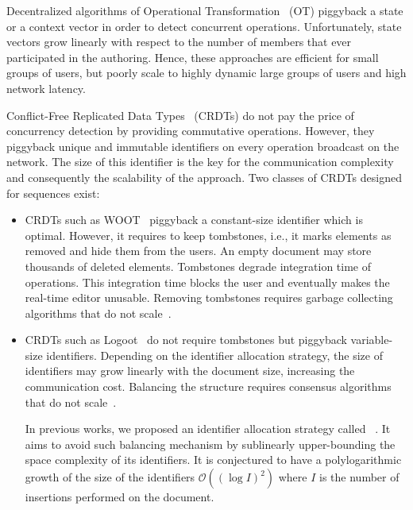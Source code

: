 Decentralized algorithms of Operational
Transformation~\cite{sun2009contextbased} (OT) piggyback a state or a context
vector in order to detect concurrent operations. Unfortunately, state vectors
grow linearly with respect to the number of members that ever participated in
the authoring. Hence, these approaches are efficient for small groups of users,
but poorly scale to highly dynamic large groups of users and high network
latency.

Conflict-Free Replicated Data Types~\cite{shapiro2011comprehensive} (CRDTs) do
not pay the price of concurrency detection by providing commutative
operations. However, they piggyback unique and immutable identifiers on every
operation broadcast on the network. The size of this identifier is the key for
the communication complexity and consequently the scalability of the
approach. Two classes of CRDTs designed for sequences exist:
\begin{itemize}[noitemsep, leftmargin=*]
\item  CRDTs such as WOOT~\cite{oster2006data} piggyback a constant-size
  identifier which is optimal. However, it requires to keep tombstones, i.e., it
  marks elements as removed and hide them from the users. An empty document may
  store thousands of deleted elements. Tombstones degrade integration time of
  operations. This integration time blocks the user and eventually makes the
  real-time editor unusable. Removing tombstones requires garbage collecting
  algorithms that do not scale~\cite{abdullahi1998garbage}.
\item CRDTs such as Logoot~\cite{weiss2010logootundo} do not require tombstones
  but piggyback variable-size identifiers. Depending on the identifier
  allocation strategy, the size of identifiers may grow linearly with the
  document size, increasing the communication cost. Balancing the structure
  requires consensus algorithms that do not
  scale~\cite{mostefaoui2015signature}.

  In previous works, we proposed an identifier allocation strategy called
  \LSEQ~\cite{nedelec2013concurrency, nedelec2013lseq}. It aims to avoid such
  balancing mechanism by sublinearly upper-bounding the space complexity of its
  identifiers. It is conjectured to have a polylogarithmic growth of the size of
  the identifiers $\mathcal{O}((\log I)^2)$ where $I$ is the number of
  insertions performed on the document.
\end{itemize}

